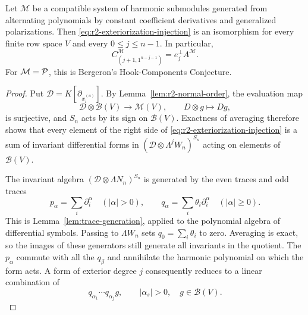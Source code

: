 \begin{theorem}\label{thm:r2-operator-hook-transfer}
Let $\mathcal M$ be a compatible system of harmonic submodules generated
from alternating polynomials by constant coefficient derivatives and
generalized polarizations.  Then \eqref{eq:r2-exteriorization-injection}
is an isomorphism for every finite row space $V$ and every
$0\leq j\leq n-1$.  In particular,
\begin{equation}\label{eq:r2-operator-hook-character}
 C_{(j+1,1^{n-j-1})}^{\mathcal M}
                  =e_j^\perp A^{\mathcal M}.
\end{equation}
For $\mathcal M=\mathcal P$, this is Bergeron's Hook-Components Conjecture.
\end{theorem}

\begin{proof}
Put $\mathcal D=K[\partial_{x_i^{(a)}}]$.  By
Lemma~\ref{lem:r2-normal-order}, the evaluation map
\[
 \mathcal D\otimes\mathcal B(V)\longrightarrow\mathcal M(V),
 \qquad D\otimes g\longmapsto Dg,
\]
is surjective, and $S_n$ acts by its sign on $\mathcal B(V)$.
Exactness of averaging therefore shows that every element of the
right side of \eqref{eq:r2-exteriorization-injection} is a sum of
invariant differential forms in
$(\mathcal D\otimes\Lambda^jW_n)^{S_n}$ acting on elements of
$\mathcal B(V)$.

The invariant algebra $(\mathcal D\otimes\Lambda N_n)^{S_n}$ is generated by
the even traces and odd traces
\[
 p_\alpha=\sum_i\partial_i^\alpha
       \quad(|\alpha|>0),\qquad
 q_\alpha=\sum_i\theta_i\partial_i^\alpha
       \quad(|\alpha|\geq0).
\]
This is Lemma~\ref{lem:trace-generation}, applied to the polynomial
algebra of differential symbols.  Passing to $\Lambda W_n$ sets
$q_0=\sum_i\theta_i$ to zero.  Averaging is exact, so the images
of these generators still generate all invariants in the quotient.
The $p_\alpha$ commute with all the $q_\beta$ and annihilate the
harmonic polynomial on which the form acts.  A form of exterior
degree $j$ consequently reduces to a linear combination of
\begin{equation}\label{eq:r2-hook-odd-word}
             q_{\alpha_1}\cdots q_{\alpha_j}g,
       \qquad |\alpha_s|>0,\quad g\in\mathcal B(V).
\end{equation}


\end{proof}
